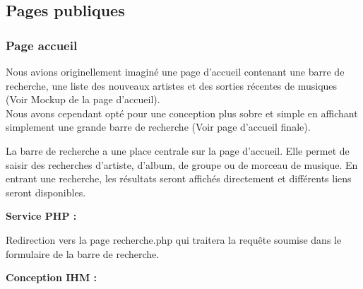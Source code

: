     \newpage



    \clearpage

    \subsection{Pages publiques}

		\subsubsection{Page accueil}

            \begin{paragraphe}
                Nous avions originellement imaginé une page d'accueil contenant une barre de recherche, une liste des nouveaux artistes et des sorties récentes de musiques (Voir Mockup de la page d'accueil).\\
                Nous avons cependant opté pour une conception plus sobre et simple en affichant simplement une grande barre de recherche (Voir page d'accueil finale).
            \end{paragraphe}

			\begin{paragraphe}
                La barre de recherche a une place centrale sur la page d'accueil. Elle permet de saisir des recherches d’artiste, d’album, de groupe ou de morceau de musique.
				En entrant une recherche, les résultats seront affichés directement et différents liens seront disponibles.
			\end{paragraphe}

			\begin{paragraphe}
				\textbf{Service PHP :}
            \end{paragraphe}

            \begin{paragraphe}
                Redirection vers la page recherche.php qui traitera la requête soumise dans le formulaire de la barre de recherche.
			\end{paragraphe}

			\begin{paragraphe}
				\textbf{Conception IHM :}
            \end{paragraphe}


